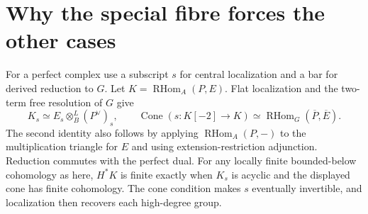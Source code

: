 \documentclass[11pt]{article}
\newcommand{\HHom}{\operatorname{RHom}}
\newcommand{\cone}{\operatorname{Cone}}
\newcommand{\fib}[1]{\overline{#1}}
\begin{document}
\section{Why the special fibre forces the other cases}
For a perfect complex use a subscript $s$ for central localization and
a bar for derived reduction to $G$. Let $K=\HHom_A(P,E)$. Flat localization
and the two-term free resolution of $G$ give
\[
 K_s\simeq E_s\otimes^L_B (P^\vee)_s,\qquad
 \cone(s:K[-2]\to K)\simeq\HHom_G(\fib P,\fib E).
\]
The second identity also follows by applying $\HHom_A(P,-)$ to the
multiplication triangle for $E$ and using extension-restriction
adjunction. Reduction commutes with the perfect dual.
For any locally finite bounded-below cohomology as here, $H^*K$ is
finite exactly when $K_s$ is acyclic and the displayed cone has finite
cohomology. The cone condition makes $s$ eventually invertible, and
localization then recovers each high-degree group.
\end{document}
